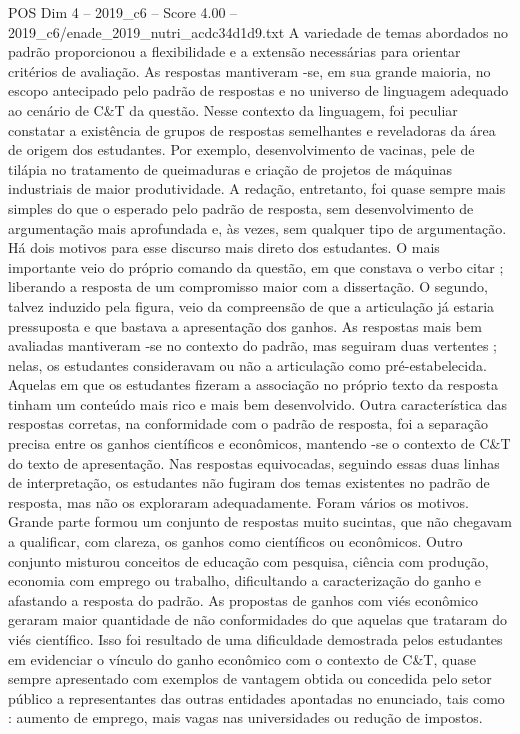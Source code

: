 \begin{textsample}{POS Dim 4 – 2019\_c6 – Score 4.00 – 2019\_c6/enade\_2019\_nutri\_acdc34d1d9.txt}
A variedade de temas abordados no padrão proporcionou a flexibilidade e a extensão necessárias para orientar critérios de avaliação.
As respostas mantiveram -se, em sua grande maioria, no escopo antecipado pelo padrão de respostas e no universo de linguagem adequado ao cenário de C\&T da questão.
Nesse contexto da linguagem, foi peculiar constatar a existência de grupos de respostas semelhantes e reveladoras da área de origem dos estudantes.
Por exemplo, desenvolvimento de vacinas, pele de tilápia no tratamento de queimaduras e criação de projetos de máquinas industriais de maior produtividade.
A redação, entretanto, foi quase sempre mais simples do que o esperado pelo padrão de resposta, sem desenvolvimento de argumentação mais aprofundada e, às vezes, sem qualquer tipo de argumentação.
Há dois motivos para esse discurso mais direto dos estudantes.
O mais importante veio do próprio comando da questão, em que constava o verbo citar ; liberando a resposta de um compromisso maior com a dissertação.
O segundo, talvez induzido pela figura, veio da compreensão de que a articulação já estaria pressuposta e que bastava a apresentação dos ganhos.
As respostas mais bem avaliadas mantiveram -se no contexto do padrão, mas seguiram duas vertentes ; nelas, os estudantes consideravam ou não a articulação como pré-estabelecida.
Aquelas em que os estudantes fizeram a associação no próprio texto da resposta tinham um conteúdo mais rico e mais bem desenvolvido.
Outra característica das respostas corretas, na conformidade com o padrão de resposta, foi a separação precisa entre os ganhos científicos e econômicos, mantendo -se o contexto de C\&T do texto de apresentação.
Nas respostas equivocadas, seguindo essas duas linhas de interpretação, os estudantes não fugiram dos temas existentes no padrão de resposta, mas não os exploraram adequadamente.
Foram vários os motivos.
Grande parte formou um conjunto de respostas muito sucintas, que não chegavam a qualificar, com clareza, os ganhos como científicos ou econômicos.
Outro conjunto misturou conceitos de educação com pesquisa, ciência com produção, economia com emprego ou trabalho, dificultando a caracterização do ganho e afastando a resposta do padrão.
As propostas de ganhos com viés econômico geraram maior quantidade de não conformidades do que aquelas que trataram do viés científico.
Isso foi resultado de uma dificuldade demostrada pelos estudantes em evidenciar o vínculo do ganho econômico com o contexto de C\&T, quase sempre apresentado com exemplos de vantagem obtida ou concedida pelo setor público a representantes das outras entidades apontadas no enunciado, tais como : aumento de emprego, mais vagas nas universidades ou redução de impostos.

\end{textsample}
